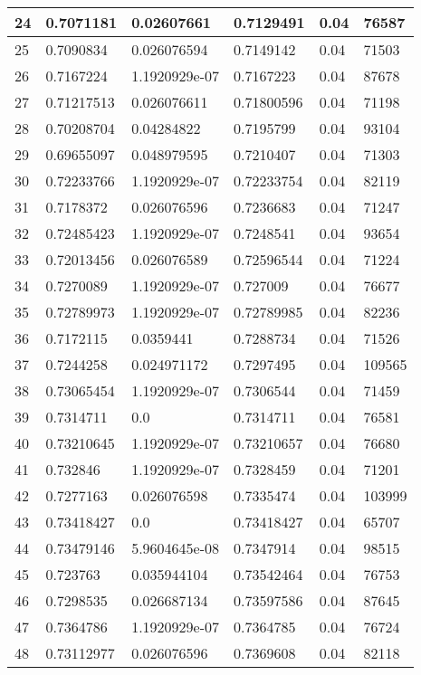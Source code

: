 \begin{longtable}{|l|l|l|l|l|l|}
24 & 0.7071181 & 0.02607661 & 0.7129491 & 0.04 & 76587 \\ \hline 
25 & 0.7090834 & 0.026076594 & 0.7149142 & 0.04 & 71503 \\ \hline 
26 & 0.7167224 & 1.1920929e-07 & 0.7167223 & 0.04 & 87678 \\ \hline 
27 & 0.71217513 & 0.026076611 & 0.71800596 & 0.04 & 71198 \\ \hline 
28 & 0.70208704 & 0.04284822 & 0.7195799 & 0.04 & 93104 \\ \hline 
29 & 0.69655097 & 0.048979595 & 0.7210407 & 0.04 & 71303 \\ \hline 
30 & 0.72233766 & 1.1920929e-07 & 0.72233754 & 0.04 & 82119 \\ \hline 
31 & 0.7178372 & 0.026076596 & 0.7236683 & 0.04 & 71247 \\ \hline 
32 & 0.72485423 & 1.1920929e-07 & 0.7248541 & 0.04 & 93654 \\ \hline 
33 & 0.72013456 & 0.026076589 & 0.72596544 & 0.04 & 71224 \\ \hline 
34 & 0.7270089 & 1.1920929e-07 & 0.727009 & 0.04 & 76677 \\ \hline 
35 & 0.72789973 & 1.1920929e-07 & 0.72789985 & 0.04 & 82236 \\ \hline 
36 & 0.7172115 & 0.0359441 & 0.7288734 & 0.04 & 71526 \\ \hline 
37 & 0.7244258 & 0.024971172 & 0.7297495 & 0.04 & 109565 \\ \hline 
38 & 0.73065454 & 1.1920929e-07 & 0.7306544 & 0.04 & 71459 \\ \hline 
39 & 0.7314711 & 0.0 & 0.7314711 & 0.04 & 76581 \\ \hline 
40 & 0.73210645 & 1.1920929e-07 & 0.73210657 & 0.04 & 76680 \\ \hline 
41 & 0.732846 & 1.1920929e-07 & 0.7328459 & 0.04 & 71201 \\ \hline 
42 & 0.7277163 & 0.026076598 & 0.7335474 & 0.04 & 103999 \\ \hline 
43 & 0.73418427 & 0.0 & 0.73418427 & 0.04 & 65707 \\ \hline 
44 & 0.73479146 & 5.9604645e-08 & 0.7347914 & 0.04 & 98515 \\ \hline 
45 & 0.723763 & 0.035944104 & 0.73542464 & 0.04 & 76753 \\ \hline 
46 & 0.7298535 & 0.026687134 & 0.73597586 & 0.04 & 87645 \\ \hline 
47 & 0.7364786 & 1.1920929e-07 & 0.7364785 & 0.04 & 76724 \\ \hline 
48 & 0.73112977 & 0.026076596 & 0.7369608 & 0.04 & 82118 \\ \hline 

\end{longtable}

